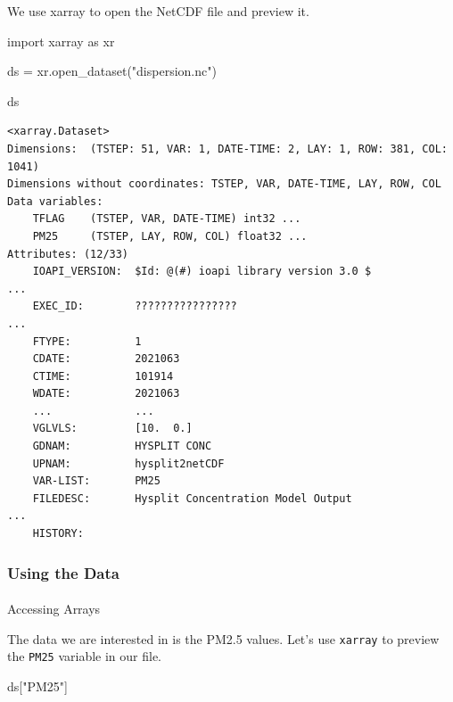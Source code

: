 \documentclass[
  letterpaper,
  DIV=11,
  numbers=noendperiod]{scrreprt}
\makeatletter
\let\oldparagraph\paragraph
\renewcommand{\paragraph}{
    \@ifstar
      \xxxParagraphStar
      \xxxParagraphNoStar
  }
\newcommand{\xxxParagraphStar}[1]{\oldparagraph*{#1}\mbox{}}
\newcommand{\xxxParagraphNoStar}[1]{\oldparagraph{#1}\mbox{}}
\newenvironment{Shaded}{\begin{snugshade}}{\end{snugshade}}
\newcommand{\ImportTok}[1]{\textcolor[rgb]{0.00,0.46,0.62}{#1}}
\newcommand{\NormalTok}[1]{\textcolor[rgb]{0.00,0.23,0.31}{#1}}
\newcommand{\OperatorTok}[1]{\textcolor[rgb]{0.37,0.37,0.37}{#1}}
\newcommand{\StringTok}[1]{\textcolor[rgb]{0.13,0.47,0.30}{#1}}
\makeatother
\begin{document}
We use xarray to open the NetCDF file and preview it.

\begin{Shaded}
\begin{Highlighting}[]
\ImportTok{import}\NormalTok{ xarray }\ImportTok{as}\NormalTok{ xr}

\NormalTok{ds }\OperatorTok{=}\NormalTok{ xr.open\_dataset(}\StringTok{"dispersion.nc"}\NormalTok{)}

\NormalTok{ds}
\end{Highlighting}
\end{Shaded}

\begin{verbatim}
<xarray.Dataset>
Dimensions:  (TSTEP: 51, VAR: 1, DATE-TIME: 2, LAY: 1, ROW: 381, COL: 1041)
Dimensions without coordinates: TSTEP, VAR, DATE-TIME, LAY, ROW, COL
Data variables:
    TFLAG    (TSTEP, VAR, DATE-TIME) int32 ...
    PM25     (TSTEP, LAY, ROW, COL) float32 ...
Attributes: (12/33)
    IOAPI_VERSION:  $Id: @(#) ioapi library version 3.0 $                    ...
    EXEC_ID:        ????????????????                                         ...
    FTYPE:          1
    CDATE:          2021063
    CTIME:          101914
    WDATE:          2021063
    ...             ...
    VGLVLS:         [10.  0.]
    GDNAM:          HYSPLIT CONC    
    UPNAM:          hysplit2netCDF  
    VAR-LIST:       PM25            
    FILEDESC:       Hysplit Concentration Model Output                       ...
    HISTORY:        
\end{verbatim}

\subsubsection{Using the Data}\label{using-the-data}

\paragraph{Accessing Arrays}\label{accessing-arrays}

The data we are interested in is the PM2.5 values. Let's use
\texttt{xarray} to preview the \texttt{PM25} variable in our file.

\begin{Shaded}
\begin{Highlighting}[]
\NormalTok{ds[}\StringTok{"PM25"}\NormalTok{]}
\end{Highlighting}
\end{Shaded}
\end{document}
